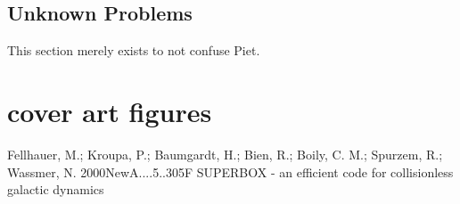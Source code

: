 \section{Unknown Problems}

This section merely exists to not confuse Piet.



\cleardoublepage
\chapter*{cover art figures}
\begin{figure}[t]
\end{figure}

\begin{figure}[b]
\end{figure}

\begin{figure}[b]
\end{figure}










Fellhauer, M.; Kroupa, P.; Baumgardt, H.; Bien, R.; Boily, C. M.; Spurzem, R.; Wassmer, N.
2000NewA....5..305F
SUPERBOX - an efficient code for collisionless galactic dynamics
